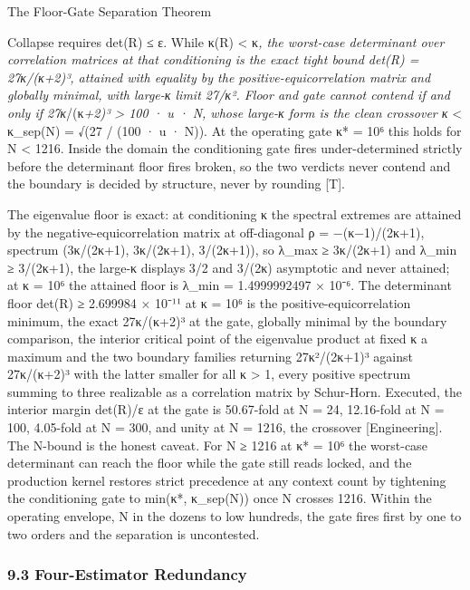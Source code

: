 \documentclass[10pt,twocolumn]{article}
\begin{document}
\begin{jbox}{The Floor-Gate Separation Theorem}

Collapse requires det(R) ≤ ε. While κ(R) \textless{} κ\emph{, the
worst-case determinant over correlation matrices at that conditioning is
the exact tight bound det(R) = 27κ/(κ+2)³, attained with equality by the
positive-equicorrelation matrix and globally minimal, with large-κ limit
27/κ². Floor and gate cannot contend if and only if 27κ}/(κ\emph{+2)³
\textgreater{} 100 · u · N, whose large-κ form is the clean crossover κ}
\textless{} κ\_sep(N) = √(27 / (100 · u · N)). At the operating gate κ*
= 10⁶ this holds for N \textless{} 1216. Inside the domain the
conditioning gate fires under-determined strictly before the determinant
floor fires broken, so the two verdicts never contend and the boundary
is decided by structure, never by rounding {[}T{]}.

\end{jbox}

The eigenvalue floor is exact: at conditioning κ the spectral extremes
are attained by the negative-equicorrelation matrix at off-diagonal ρ =
−(κ−1)/(2κ+1), spectrum (3κ/(2κ+1), 3κ/(2κ+1), 3/(2κ+1)), so λ\_max ≥
3κ/(2κ+1) and λ\_min ≥ 3/(2κ+1), the large-κ displays 3/2 and 3/(2κ)
asymptotic and never attained; at κ = 10⁶ the attained floor is λ\_min =
1.4999992497 × 10⁻⁶. The determinant floor det(R) ≥ 2.699984 × 10⁻¹¹ at
κ = 10⁶ is the positive-equicorrelation minimum, the exact 27κ/(κ+2)³ at
the gate, globally minimal by the boundary comparison, the interior
critical point of the eigenvalue product at fixed κ a maximum and the
two boundary families returning 27κ²/(2κ+1)³ against 27κ/(κ+2)³ with the
latter smaller for all κ \textgreater{} 1, every positive spectrum
summing to three realizable as a correlation matrix by Schur-Horn.
Executed, the interior margin det(R)/ε at the gate is 50.67-fold at N =
24, 12.16-fold at N = 100, 4.05-fold at N = 300, and unity at N = 1216,
the crossover {[}Engineering{]}. The N-bound is the honest caveat. For N
≥ 1216 at κ* = 10⁶ the worst-case determinant can reach the floor while
the gate still reads locked, and the production kernel restores strict
precedence at any context count by tightening the conditioning gate to
min(κ*, κ\_sep(N)) once N crosses 1216. Within the operating envelope, N
in the dozens to low hundreds, the gate fires first by one to two orders
and the separation is uncontested.

\hypertarget{four-estimator-redundancy}{%
\subsubsection{9.3 Four-Estimator
Redundancy}\label{four-estimator-redundancy}}
\end{document}
